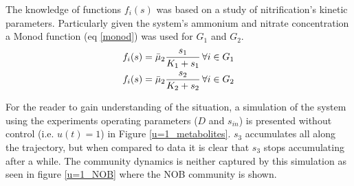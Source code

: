 \documentclass[3p,times]{elsarticle}
\begin{document}
The knowledge of functions $f_i(s)$ was based on a study of nitrification's kinetic parameters\cite{Wiesmann1994}. Particularly given the system's ammonium and nitrate concentration a Monod function (eq \eqref{monod}) was used for $G_1$ and $G_2$. 
\begin{align}
\label{monod} f_i(s) &= \bar{\mu}_2 \dfrac{s_1}{K_1 +s_1} \, \forall i \in G_1 \\
\notag  f_i(s) &= \bar{\mu}_2 \dfrac{s_2}{K_2 +s_2 } \, \forall i \in G_2
\end{align}

For the reader to gain understanding of the situation, a simulation of the system using the experiments operating parameters ($D$ and $s_{in}$) is presented without control (i.e. $u(t)= 1$) in  Figure \ref{u=1_metabolites}. $s_3$ accumulates all along the trajectory, but when compared to data it is clear that $s_3$ stops accumulating after a while. The community dynamics is neither captured by this simulation as seen in figure \ref{u=1_NOB} where the NOB community is shown.
\end{document}
